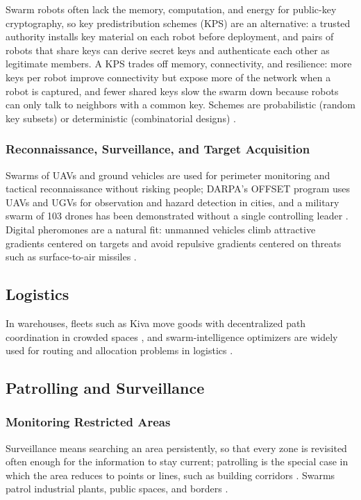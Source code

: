 Swarm robots often lack the memory, computation, and energy for public-key
cryptography, so key predistribution schemes (KPS) are an alternative: a trusted
authority installs key material on each robot before deployment, and pairs of
robots that share keys can derive secret keys and authenticate each other as
legitimate members. A KPS trades off memory, connectivity, and resilience: more
keys per robot improve connectivity but expose more of the network when a robot
is captured, and fewer shared keys slow the swarm down because robots can only
talk to neighbors with a common key. Schemes are probabilistic (random key
subsets) or deterministic (combinatorial designs) \cite{tan2016handbook}.

\subsubsection{Reconnaissance, Surveillance, and Target Acquisition}

Swarms of UAVs and ground vehicles are used for perimeter monitoring and tactical
reconnaissance without risking people; DARPA's OFFSET program uses UAVs and UGVs
for observation and hazard detection in cities, and a military swarm of 103
drones has been demonstrated without a single controlling leader
\cite{shahzad2023review}. Digital pheromones are a natural fit: unmanned vehicles
climb attractive gradients centered on targets and avoid repulsive gradients
centered on threats such as surface-to-air missiles \cite{sahin2005swarm}.

\subsection{Logistics}

In warehouses, fleets such as Kiva move goods with decentralized path
coordination in crowded spaces \cite{shahzad2023review}, and swarm-intelligence
optimizers are widely used for routing and allocation problems in logistics
\cite{seebacher2025collective}.

\subsection{Patrolling and Surveillance}

\subsubsection{Monitoring Restricted Areas}

Surveillance means searching an area persistently, so that every zone is
revisited often enough for the information to stay current; patrolling is the
special case in which the area reduces to points or lines, such as building
corridors \cite{garcia2018comparison}. Swarms patrol industrial plants, public
spaces, and borders \cite{bhowmick2024bio}.

